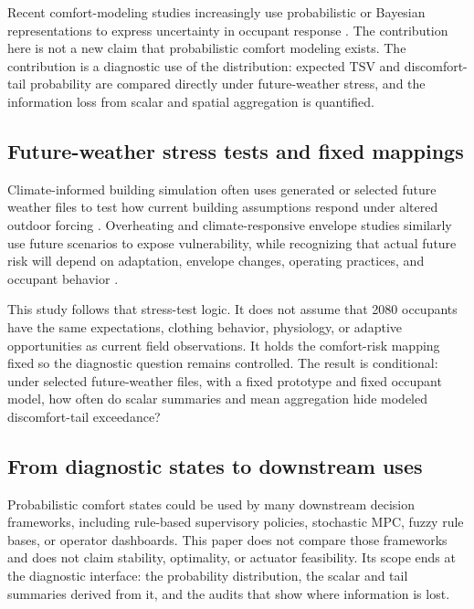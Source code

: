 Recent comfort-modeling studies increasingly use probabilistic or Bayesian representations to express uncertainty in occupant response \citep{Luo2019GlobalDB,Kim2019Bayesian,Zhang2024BayesianMeta}. The contribution here is not a new claim that probabilistic comfort modeling exists. The contribution is a diagnostic use of the distribution: expected TSV and discomfort-tail probability are compared directly under future-weather stress, and the information loss from scalar and spatial aggregation is quantified.

\subsection{Future-weather stress tests and fixed mappings}

Climate-informed building simulation often uses generated or selected future weather files to test how current building assumptions respond under altered outdoor forcing \citep{GuoHe2026sAMY,GuoHe2026InputQuality}. Overheating and climate-responsive envelope studies similarly use future scenarios to expose vulnerability, while recognizing that actual future risk will depend on adaptation, envelope changes, operating practices, and occupant behavior \citep{Chaer2026OverheatingFramework,Ozarisoy2026ClimateResponsiveEnvelope}.

This study follows that stress-test logic. It does not assume that 2080 occupants have the same expectations, clothing behavior, physiology, or adaptive opportunities as current field observations. It holds the comfort-risk mapping fixed so the diagnostic question remains controlled. The result is conditional: under selected future-weather files, with a fixed prototype and fixed occupant model, how often do scalar summaries and mean aggregation hide modeled discomfort-tail exceedance?

\subsection{From diagnostic states to downstream uses}

Probabilistic comfort states could be used by many downstream decision frameworks, including rule-based supervisory policies, stochastic MPC, fuzzy rule bases, or operator dashboards. This paper does not compare those frameworks and does not claim stability, optimality, or actuator feasibility. Its scope ends at the diagnostic interface: the probability distribution, the scalar and tail summaries derived from it, and the audits that show where information is lost.
